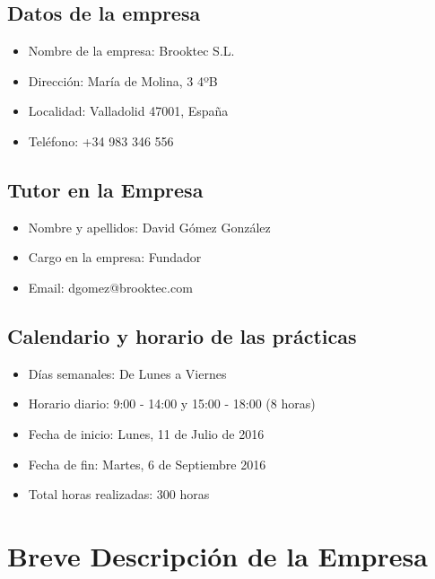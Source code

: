 \documentclass[11pt, a4paper,spanish]{article}
\begin{document}
        \subsection{Datos de la empresa}

            \begin{itemize}
              \item Nombre de la empresa: Brooktec S.L.
              \item Dirección:  María de Molina, 3 4ºB
              \item Localidad:  Valladolid 47001, España
              \item Teléfono:  +34 983 346 556
            \end{itemize}


        \subsection{Tutor en la Empresa}

            \begin{itemize}
              \item Nombre y apellidos: David Gómez González
              \item Cargo en la empresa: Fundador
              \item Email: dgomez@brooktec.com
            \end{itemize}


        \subsection{Calendario y horario de las prácticas}

            \begin{itemize}
              \item Días semanales: De Lunes a Viernes
              \item Horario diario: 9:00 - 14:00 y 15:00 - 18:00 (8 horas)
              \item Fecha de inicio: Lunes, 11 de Julio de 2016
              \item Fecha de fin:  Martes, 6 de Septiembre 2016
              \item Total horas realizadas: 300 horas
            \end{itemize}

	\newpage
    \section{Breve Descripción de la Empresa}
\end{document}
